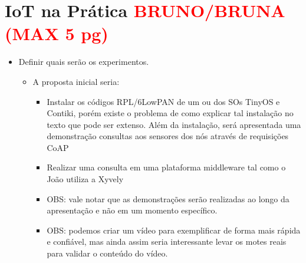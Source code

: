 
\section{IoT na Prática \textcolor{red}{BRUNO/BRUNA (MAX 5 pg)}} 
\label{sec:ITP}

  \begin{itemize}
    \item Definir quais serão os experimentos.
    \begin{itemize}
      \item A proposta inicial seria:
      \begin{itemize}
	\item Instalar os códigos RPL/6LowPAN de um ou dos SOs TinyOS e 
Contiki, porém  existe o problema de como explicar tal instalação no texto que 
pode ser extenso. Além da instalação, será apresentada uma demonstração 
consultas aos sensores dos nós através de requisições CoAP
	\item Realizar uma consulta em uma plataforma middleware tal como o 
João utiliza a Xyvely
	\item OBS: vale notar que as demonstrações serão 
realizadas ao longo da apresentação e não em um momento específico.
	\item OBS: podemos criar um vídeo para exemplificar de forma mais 
rápida e confiável, mas ainda assim seria interessante levar os motes reais 
para validar o conteúdo do vídeo.
      \end{itemize}
    \end{itemize}
  \end{itemize}
